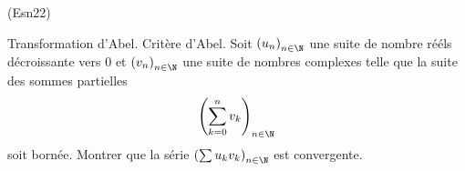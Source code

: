 \begin{tiny}(Esn22)\end{tiny} Transformation d'Abel. Critère d'Abel.\newline
Soit $\left( u_n \right)_{n \in \N}$ une suite de nombre rééls décroissante vers $0$ et $\left( v_n \right)_{n \in \N}$ une suite de nombres complexes telle que la suite des sommes partielles
\begin{displaymath}
 \left( \sum_{k=0}^n v_k \right)_{n \in \N}
\end{displaymath}
soit bornée. Montrer que la série $\left( \sum u_k v_k \right)_{n \in \N}$ est convergente.
